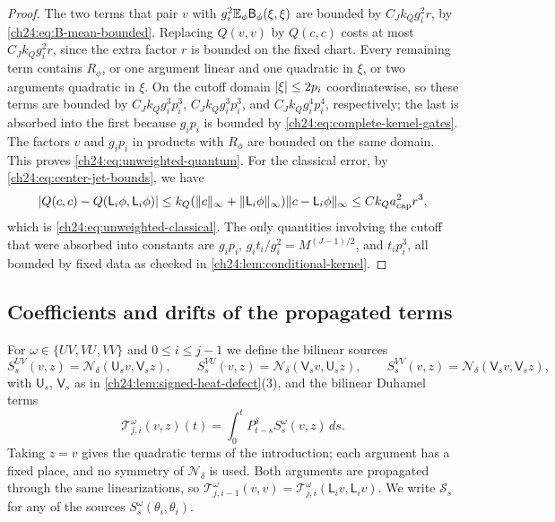\begin{proof}
The two terms that pair $v$ with $g_i^2\mathbb E_\phi\mathsf B_\phi(\xi,\xi)$ are bounded by $C_Jk_Qg_i^2r$, by \eqref{ch24:eq:B-mean-bounded}. Replacing $Q(v,v)$ by $Q(c,c)$ costs at most $C_Jk_Qg_i^2r$, since the extra factor $r$ is bounded on the fixed chart. Every remaining term contains $R_\phi$, or one argument linear and one quadratic in $\xi$, or two arguments quadratic in $\xi$. On the cutoff domain $\lvert \xi\rvert\le2p_i$ coordinatewise, so these terms are bounded by $C_Jk_Qg_i^3p_i^3$, $C_Jk_Qg_i^3p_i^3$, and $C_Jk_Qg_i^4p_i^4$, respectively; the last is absorbed into the first because $g_ip_i$ is bounded by \eqref{ch24:eq:complete-kernel-gates}. The factors $v$ and $g_ip_i$ in products with $R_\phi$ are bounded on the same domain. This proves \eqref{ch24:eq:unweighted-quantum}. For the classical error, by \eqref{ch24:eq:center-jet-bounds}, we have
\[
 \lvert Q(c,c)-Q(\mathsf L_i\phi,\mathsf L_i\phi)\rvert\le k_Q(\lVert c\rVert_\infty+\lVert \mathsf L_i\phi\rVert_\infty)\lVert c-\mathsf L_i\phi\rVert_\infty\le Ck_Qa_{\mathrm{cap}}^2r^3,
\]
which is \eqref{ch24:eq:unweighted-classical}. The only quantities involving the cutoff that were absorbed into constants are $g_ip_i$, $g_it_i/g_i^2=M^{(J-1)/2}$, and $t_ip_i^3$, all bounded by fixed data as checked in \cref{ch24:lem:conditional-kernel}.
\end{proof}

\subsection{Coefficients and drifts of the propagated terms}

For $\omega\in\{UV,VU,VV\}$ and $0\le i\le j-1$ we define the bilinear sources
\[
 S_s^{UV}(v,z)=\mathcal N_\delta(\mathsf U_sv,\mathsf V_sz),\qquad
 S_s^{VU}(v,z)=\mathcal N_\delta(\mathsf V_sv,\mathsf U_sz),\qquad
 S_s^{VV}(v,z)=\mathcal N_\delta(\mathsf V_sv,\mathsf V_sz),
\]
with $\mathsf U_s$, $\mathsf V_s$ as in \cref{ch24:lem:signed-heat-defect}(3), and the bilinear Duhamel terms
\[
 \mathscr T_{j,i}^\omega(v,z)(t)=\int_0^tP_{t-s}^\delta S_s^\omega(v,z)\,ds.
\]
Taking $z=v$ gives the quadratic terms of the introduction; each argument has a fixed place, and no symmetry of $\mathcal N_\delta$ is used. Both arguments are propagated through the same linearizations, so $\mathscr T_{j,i-1}^\omega(v,v)=\mathscr T_{j,i}^\omega(\mathsf L_iv,\mathsf L_iv)$. We write $\mathscr S_s$ for any of the sources $S_s^\omega(\theta_i,\theta_i)$.

